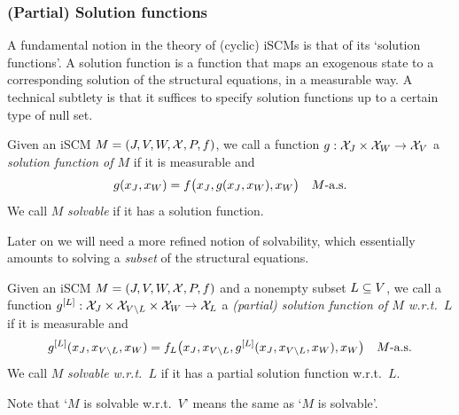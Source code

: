 \subsubsection{(Partial) Solution functions}

A fundamental notion in the theory of (cyclic) iSCMs is that of its `solution functions'.
A solution function is a function that maps an exogenous state to a corresponding solution of the structural equations, in a measurable way.
A technical subtlety is that it suffices to specify solution functions up to a certain type of null set.
\begin{Def}\label{def:scm_solution_functions}
  Given an iSCM $M = \left ( J, V, W, \mathcal{X}, P, f \right )$, we call a function
  $g : \mathcal{X}_{J} \times \mathcal{X}_{W} \to \mathcal{X}_{V}$ a \emph{solution function of $M$} if it is measurable and
  $$g(x_{J},x_{W}) = f\big(x_{J}, g(x_{J},x_{W}), x_{W}\big) \quad M\text{-a.s.}$$
  We call $M$ \emph{solvable} if it has a solution function.
\end{Def}
Later on we will need a more refined notion of solvability, which essentially amounts to solving a \emph{subset} of the structural equations.
\begin{Def}\label{def:scm_partial_solution_functions}
  Given an iSCM $M = \left ( J, V, W, \mathcal{X}, P, f \right )$ and a nonempty subset $L \subseteq V$, we call a function
  $g^{[L]} : \mathcal{X}_{J} \times \mathcal{X}_{V\setminus L} \times \mathcal{X}_{W} \to \mathcal{X}_L$ a \emph{(partial) solution function of $M$ w.r.t.\ $L$} if it is measurable and
  $$g^{[L]}(x_{J},x_{V\setminus L},x_{W}) = f_L\big(x_{J}, x_{V\setminus L}, g^{[L]}(x_{J},x_{V\setminus L},x_{W}), x_{W}\big) \quad M\text{-a.s.}$$
  We call $M$ \emph{solvable w.r.t.\ $L$} if it has a partial solution function w.r.t.\ $L$.
\end{Def}
Note that `$M$ is solvable w.r.t.\ $V$' means the same as `$M$ is solvable'.

